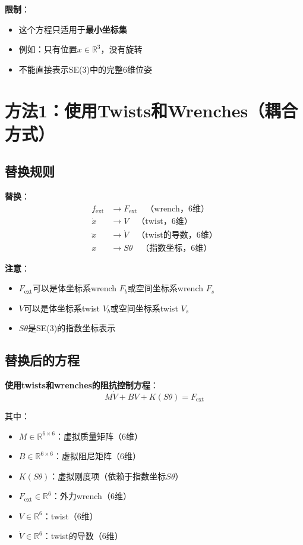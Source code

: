 \documentclass[12pt,a4paper]{article}
\begin{document}
\textbf{限制}：
\begin{itemize}
\item 这个方程只适用于\textbf{最小坐标集}
\item 例如：只有位置$x \in \mathbb{R}^3$，没有旋转
\item 不能直接表示SE(3)中的完整6维位姿
\end{itemize}

\section{方法1：使用Twists和Wrenches（耦合方式）}

\subsection{替换规则}

\textbf{替换}：
\begin{align}
f_{\text{ext}} &\to F_{\text{ext}} \quad \text{（wrench，6维）} \\
\dot{x} &\to V \quad \text{（twist，6维）} \\
\ddot{x} &\to \dot{V} \quad \text{（twist的导数，6维）} \\
x &\to S\theta \quad \text{（指数坐标，6维）}
\end{align}

\textbf{注意}：
\begin{itemize}
\item $F_{\text{ext}}$可以是体坐标系wrench $F_b$或空间坐标系wrench $F_s$
\item $V$可以是体坐标系twist $V_b$或空间坐标系twist $V_s$
\item $S\theta$是SE(3)的指数坐标表示
\end{itemize}

\subsection{替换后的方程}

\textbf{使用twists和wrenches的阻抗控制方程}：
\begin{equation}
M\dot{V} + BV + K(S\theta) = F_{\text{ext}} \tag{11.64-twist}
\end{equation}

其中：
\begin{itemize}
\item $M \in \mathbb{R}^{6 \times 6}$：虚拟质量矩阵（6维）
\item $B \in \mathbb{R}^{6 \times 6}$：虚拟阻尼矩阵（6维）
\item $K(S\theta)$：虚拟刚度项（依赖于指数坐标$S\theta$）
\item $F_{\text{ext}} \in \mathbb{R}^6$：外力wrench（6维）
\item $V \in \mathbb{R}^6$：twist（6维）
\item $\dot{V} \in \mathbb{R}^6$：twist的导数（6维）
\end{itemize}
\end{document}
